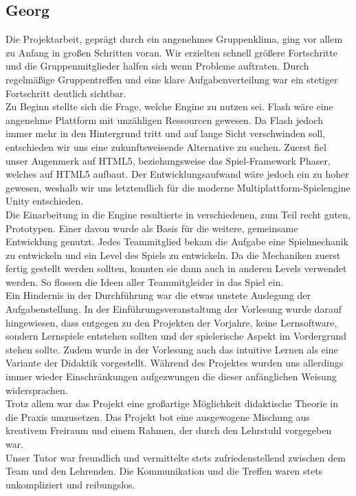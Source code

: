 \documentclass[10pt,a4paper,notitlepage]{report}
\begin{document}
	\subsection{Georg}
	Die Projektarbeit, geprägt durch ein angenehmes Gruppenklima, ging vor allem zu Anfang in großen Schritten voran. Wir erzielten schnell größere Fortschritte und die Gruppenmitglieder halfen sich wenn Probleme auftraten. Durch regelmäßige Gruppentreffen und eine klare Aufgabenverteilung war ein stetiger Fortschritt deutlich sichtbar.\\
	Zu Beginn stellte sich die Frage, welche Engine zu nutzen sei. Flash wäre eine angenehme Plattform mit unzähligen Ressourcen gewesen. Da Flash jedoch immer mehr in den Hintergrund tritt und auf lange Sicht verschwinden soll, entschieden wir uns eine zukunftsweisende Alternative zu suchen. Zuerst fiel unser Augenmerk auf HTML5, beziehungsweise das Spiel-Framework Phaser, welches auf HTML5 aufbaut. Der Entwicklungsaufwand wäre jedoch ein zu hoher gewesen, weshalb wir uns letztendlich für die moderne Multiplattform-Spielengine Unity entschieden.\\
	Die Einarbeitung in die Engine resultierte in verschiedenen, zum Teil recht guten, Prototypen. Einer davon wurde als Basis für die weitere, gemeinsame Entwicklung genutzt. Jedes Teammitglied bekam die Aufgabe eine Spielmechanik zu entwickeln und ein Level des Spiels zu entwickeln. Da die Mechaniken zuerst fertig gestellt werden sollten, konnten sie dann auch in anderen Levels verwendet werden. So flossen die Ideen aller Teammitgleider in das Spiel ein.\\
	Ein Hindernis in der Durchführung war die etwas unstete Auslegung der Aufgabenstellung. In der Einführungsveranstaltung der Vorlesung wurde darauf hingewiesen, dass entgegen zu den Projekten der Vorjahre, keine Lernsoftware, sondern Lernspiele entstehen sollten und der spielerische Aspekt im Vordergrund stehen sollte. Zudem wurde in der Vorlesung auch das intuitive Lernen als eine Variante der Didaktik vorgestellt. Während des Projektes wurden uns allerdings immer wieder Einschränkungen aufgezwungen die dieser anfänglichen Weisung widersprachen.\\
	Trotz allem war das Projekt eine großartige Möglichkeit didaktische Theorie in die Praxis umzusetzen. Das Projekt bot eine ausgewogene Mischung aus kreativem Freiraum und einem Rahmen, der durch den Lehrstuhl vorgegeben war.\\
	Unser Tutor war freundlich und vermittelte stets zufriedenstellend zwischen dem Team und den Lehrenden. Die Kommunikation und die Treffen waren stets unkompliziert und reibungslos.\\
\end{document}

